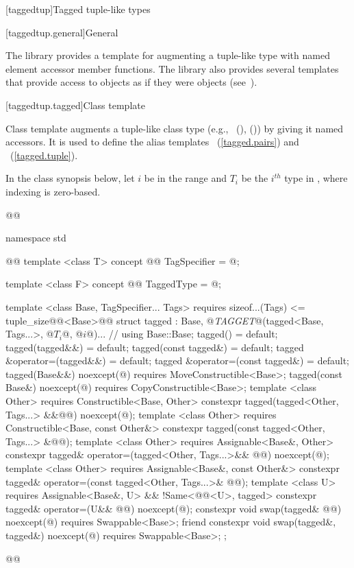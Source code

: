 {\color{addclr}
[taggedtup]{Tagged tuple-like types}

[taggedtup.general]{General}

\pnum The library provides a template for augmenting a tuple-like type with named element accessor
member functions. The library also provides several templates that provide access to 
objects as if they were  objects (see~).

[taggedtup.tagged]{Class template }

\pnum
Class template  augments a tuple-like class type (e.g., ~(),
 ()) by giving it named accessors. It is used to define the alias
templates ~(\ref{tagged.pairs}) and
~(\ref{tagged.tuple}).

\pnum In the class synopsis below, let $i$ be in the range
 and $T_i$ be the $i^{th}$ type in , where indexing
is zero-based.

%
\begin{codeblock}
@@

namespace std { @@
  template <class T>
  concept @@ TagSpecifier = @\impdef@;

  template <class F>
  concept @@ TaggedType = @\impdef@;

  template <class Base, TagSpecifier... Tags>
    requires sizeof...(Tags) <= tuple_size@@<Base>@@
  struct tagged :
    Base, @\textit{TAGGET}@(tagged<Base, Tags...>, @$T_i$@, @$i$@)... { // \seebelow
    using Base::Base;
    tagged() = default;
    tagged(tagged&&) = default;
    tagged(const tagged&) = default;
    tagged &operator=(tagged&&) = default;
    tagged &operator=(const tagged&) = default;
    tagged(Base&&) noexcept(@\seebelow@)
      requires MoveConstructible<Base>;
    tagged(const Base&) noexcept(@\seebelow@)
      requires CopyConstructible<Base>;
    template <class Other>
      requires Constructible<Base, Other>
    constexpr tagged(tagged<Other, Tags...> &&@@) noexcept(@\seebelow@);
    template <class Other>
      requires Constructible<Base, const Other&>
    constexpr tagged(const tagged<Other, Tags...> &@@);
    template <class Other>
      requires Assignable<Base&, Other>
    constexpr tagged& operator=(tagged<Other, Tags...>&& @@) noexcept(@\seebelow@);
    template <class Other>
      requires Assignable<Base&, const Other&>
    constexpr tagged& operator=(const tagged<Other, Tags...>& @@);
    template <class U>
      requires Assignable<Base&, U> && !Same<@@<U>, tagged>
    constexpr tagged& operator=(U&& @@) noexcept(@\seebelow@);
    constexpr void swap(tagged& @@) noexcept(@\seebelow@)
      requires Swappable<Base>;
    friend constexpr void swap(tagged&, tagged&) noexcept(@\seebelow@)
      requires Swappable<Base>;
  };
}@\oldtxt{\}\}\}}@
\end{codeblock}

}
